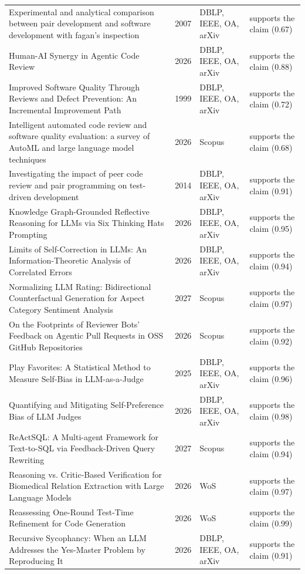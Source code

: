 \begin{longtable}{@{}%
  >{\raggedright\arraybackslash}p{}c%
  >{\raggedright\arraybackslash}p{}%
  >{\raggedright\arraybackslash}p{}@{}}
Experimental and analytical comparison between pair development and software development with fagan's inspection & 2007 & DBLP, IEEE, OA, arXiv & supports the claim (0.67) \\
Human-AI Synergy in Agentic Code Review & 2026 & DBLP, IEEE, OA, arXiv & supports the claim (0.88) \\
Improved Software Quality Through Reviews and Defect Prevention: An Incremental Improvement Path & 1999 & DBLP, IEEE, OA, arXiv & supports the claim (0.72) \\
Intelligent automated code review and software quality evaluation: a survey of AutoML and large language model techniques & 2026 & Scopus & supports the claim (0.68) \\
Investigating the impact of peer code review and pair programming on test-driven development & 2014 & DBLP, IEEE, OA, arXiv & supports the claim (0.91) \\
Knowledge Graph-Grounded Reflective Reasoning for LLMs via Six Thinking Hats Prompting & 2026 & DBLP, IEEE, OA, arXiv & supports the claim (0.95) \\
Limits of Self-Correction in LLMs: An Information-Theoretic Analysis of Correlated Errors & 2026 & DBLP, IEEE, OA, arXiv & supports the claim (0.94) \\
Normalizing LLM Rating: Bidirectional Counterfactual Generation for Aspect Category Sentiment Analysis & 2027 & Scopus & supports the claim (0.97) \\
On the Footprints of Reviewer Bots' Feedback on Agentic Pull Requests in OSS GitHub Repositories & 2026 & Scopus & supports the claim (0.92) \\
Play Favorites: A Statistical Method to Measure Self-Bias in LLM-as-a-Judge & 2025 & DBLP, IEEE, OA, arXiv & supports the claim (0.96) \\
Quantifying and Mitigating Self-Preference Bias of LLM Judges & 2026 & DBLP, IEEE, OA, arXiv & supports the claim (0.98) \\
ReActSQL: A Multi-agent Framework for Text-to-SQL via Feedback-Driven Query Rewriting & 2027 & Scopus & supports the claim (0.94) \\
Reasoning vs. Critic-Based Verification for Biomedical Relation Extraction with Large Language Models & 2026 & WoS & supports the claim (0.97) \\
Reassessing One-Round Test-Time Refinement for Code Generation & 2026 & WoS & supports the claim (0.99) \\
Recursive Sycophancy: When an LLM Addresses the Yes-Master Problem by Reproducing It & 2026 & DBLP, IEEE, OA, arXiv & supports the claim (0.91) \\

\end{longtable}
